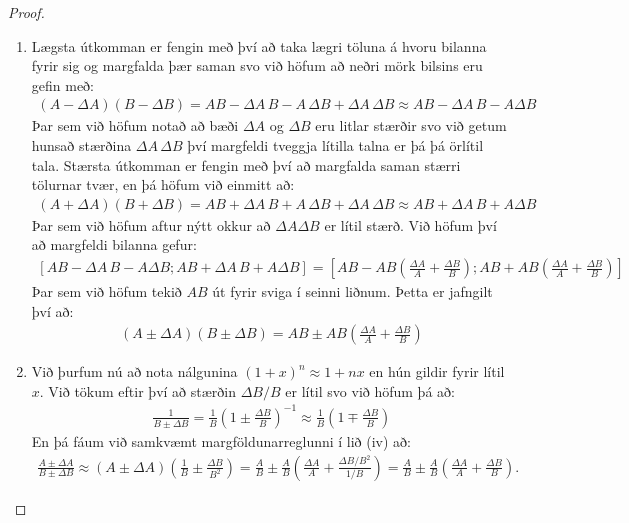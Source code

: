 \ifdefined \wholebook \else\documentclass[oneside]{book}\usepackage{EdlBook}\graphicspath{{figures/}}
\begin{document}
\begin{proof}
\begin{enumerate}[label = \textbf{(\roman*)}]
    \item Lægsta útkomman er fengin með því að taka lægri töluna á hvoru bilanna fyrir sig og margfalda þær saman svo við höfum að neðri mörk bilsins eru gefin með:
    \begin{align*}
        (A - \Delta A)(B - \Delta B) = AB - \Delta A \, B - A \, \Delta B + \Delta A \, \Delta B \approx AB - \Delta A\, B - A \Delta B
    \end{align*}
    Þar sem við höfum notað að bæði $\Delta A$ og $\Delta B$ eru litlar stærðir svo við getum hunsað stærðina $\Delta A \, \Delta B$ því margfeldi tveggja lítilla talna er þá þá örlítil tala. Stærsta útkomman er fengin með því að margfalda saman stærri tölurnar tvær, en þá höfum við einmitt að:
    \begin{align*}
        (A + \Delta A)(B + \Delta B) = AB + \Delta A \, B + A \, \Delta B + \Delta A \, \Delta B \approx AB + \Delta A\, B + A \Delta B
    \end{align*}
    Þar sem við höfum aftur nýtt okkur að $\Delta A \Delta B$ er lítil stærð. Við höfum því að margfeldi bilanna gefur:
    \begin{align*}
        \left[AB - \Delta A\, B - A \Delta B; AB + \Delta A\, B + A \Delta B\right] = \left[AB - AB\left( \frac{\Delta A}{A} + \frac{\Delta B}{B} \right) ; AB + AB\left( \frac{\Delta A}{A} + \frac{\Delta B}{B} \right) \right]
    \end{align*}
    Þar sem við höfum tekið $AB$ út fyrir sviga í seinni liðnum. Þetta er jafngilt því að:
    \begin{align*}
        (A \pm \Delta A)(B \pm \Delta B) =  AB \pm AB\left( \frac{\Delta A}{A} + \frac{\Delta B}{B} \right)
    \end{align*}
    
    \item Við þurfum nú að nota nálgunina $(1+x)^n \approx 1 + nx$ en hún gildir fyrir lítil $x$. Við tökum eftir því að stærðin $\Delta B/B$ er lítil svo við höfum þá að:
    \begin{align*}
        \frac{1}{B \pm \Delta B} = \frac{1}{B}\left(1 \pm \frac{\Delta B}{B}\right)^{-1} \approx \frac{1}{B}\left(1 \mp \frac{\Delta B}{B} \right)
    \end{align*}
    En þá fáum við samkvæmt margföldunarreglunni í lið (iv) að:
    \begin{align*}
        \frac{A \pm \Delta A}{B \pm \Delta B} \approx \left( A \pm \Delta A \right) \left( \frac{1}{B} \pm \frac{\Delta B}{B^2} \right) = \frac{A}{B} \pm \frac{A}{B}\left( \frac{\Delta A}{A} + \frac{\Delta B / B^2}{1/B} \right) = \frac{A}{B} \pm \frac{A}{B} \left( \frac{\Delta A}{A} + \frac{\Delta B}{B} \right).
    \end{align*}
\end{enumerate}
\end{proof}
\end{document}
